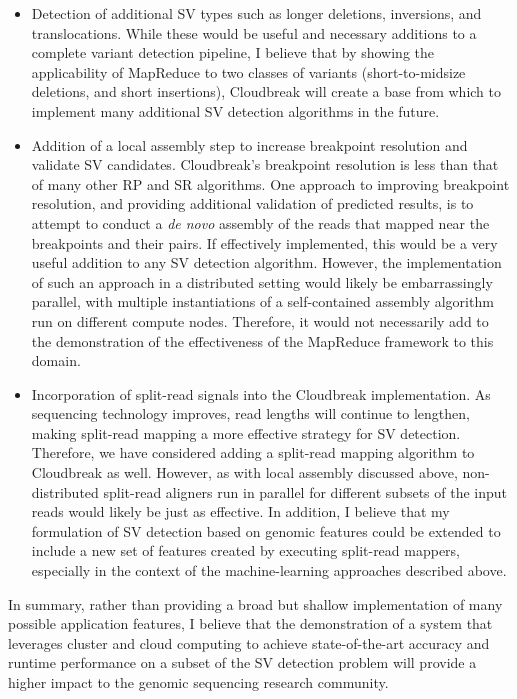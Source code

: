 \documentclass [11pt] {report}
\begin{document}
\begin{itemize}
 \item Detection of additional SV types such as longer deletions, inversions, and translocations. While these would be useful and necessary additions to a complete variant detection pipeline, I believe that by showing the applicability of MapReduce to two classes of variants (short-to-midsize deletions, and short insertions), Cloudbreak will create a base from which to implement many additional SV detection algorithms in the future.
 \item Addition of a local assembly step to increase breakpoint resolution and validate SV candidates. Cloudbreak's breakpoint resolution is less than that of many other RP and SR algorithms. One approach to improving breakpoint resolution, and providing additional validation of predicted results, is to attempt to conduct a \emph{de novo} assembly of the reads that mapped near the breakpoints and their pairs. If effectively implemented, this would be a very useful addition to any SV detection algorithm. However, the implementation of such an approach in a distributed setting would likely be embarrassingly parallel, with multiple instantiations of a self-contained assembly algorithm run on different compute nodes. Therefore, it would not necessarily add to the demonstration of the effectiveness of the MapReduce framework to this domain.
 \item Incorporation of split-read signals into the Cloudbreak implementation. As sequencing technology improves, read lengths will continue to lengthen, making split-read mapping a more effective strategy for SV detection. Therefore, we have considered adding a split-read mapping algorithm to Cloudbreak as well. However, as with local assembly discussed above, non-distributed split-read aligners run in parallel for different subsets of the input reads would likely be just as effective. In addition, I believe that my formulation of SV detection based on genomic features could be extended to include a new set of features created by executing split-read mappers, especially in the context of the machine-learning approaches described above.
\end{itemize}

In summary, rather than providing a broad but shallow implementation of many possible application features, I believe that the demonstration of a system that leverages cluster and cloud computing to achieve state-of-the-art accuracy and runtime performance on a subset of the SV detection problem will provide a higher impact to the genomic sequencing research community.
\end{document}
